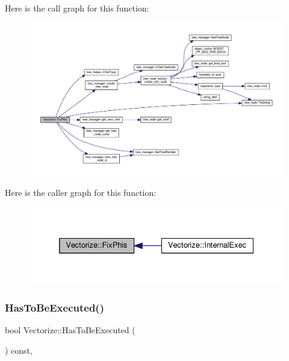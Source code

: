 Here is the call graph for this function\+:
\nopagebreak
\begin{figure}[H]
\begin{center}
\leavevmode
\includegraphics[width=350pt]{d5/da5/classVectorize_ad00739ff3efe2a9d5b2676fbc2a461be_cgraph}
\end{center}
\end{figure}
Here is the caller graph for this function\+:
\nopagebreak
\begin{figure}[H]
\begin{center}
\leavevmode
\includegraphics[width=332pt]{d5/da5/classVectorize_ad00739ff3efe2a9d5b2676fbc2a461be_icgraph}
\end{center}
\end{figure}
\mbox{\label{classVectorize_a2001b38db34ec3dcff8e011436c3cd32}} 
\subsubsection{\texorpdfstring{Has\+To\+Be\+Executed()}{HasToBeExecuted()}}
{\footnotesize\ttfamily bool Vectorize\+::\+Has\+To\+Be\+Executed (\begin{DoxyParamCaption}{ }\end{DoxyParamCaption}) const\hspace{0.3cm}{\ttfamily [override]}, {\ttfamily [virtual]}}



